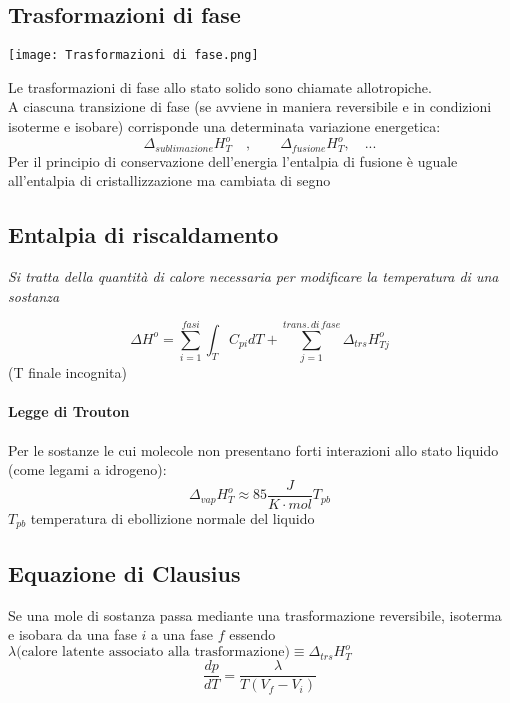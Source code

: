 \documentclass{article}
\newcommand{\ce}[1]{\begin{center}\textit{#1}\end{center}}
\begin{document}
\subsection{Trasformazioni di fase}
\begin{center}
    \texttt{[image: Trasformazioni di fase.png]}
\end{center}
Le trasformazioni di fase allo stato solido sono chiamate allotropiche. \\
A ciascuna transizione di fase (se avviene in maniera reversibile e in condizioni isoterme e isobare) corrisponde una determinata variazione energetica:
\begin{equation*}
    \Delta_{sublimazione}H^o_T \quad , \quad \quad \Delta_{fusione}H^o_T, \quad ...
\end{equation*}
Per il principio di conservazione dell'energia l'entalpia di fusione è uguale all'entalpia di cristallizzazione ma cambiata di segno

\subsection{Entalpia di riscaldamento}
\ce{Si tratta della quantità di calore necessaria per modificare la temperatura di una sostanza}
\begin{equation*}
    \Delta H^o=\sum_{i=1}^{fasi}\int_TC_{pi}dT+\sum_{j=1}^{trans. \, di \, fase} \Delta_{trs}H^o_{Tj}
\end{equation*}
(T finale incognita)
\paragraph{Legge di Trouton}
Per le sostanze le cui molecole non presentano forti interazioni allo stato liquido (come legami a idrogeno):
\begin{equation*}
    \Delta_{vap}H^o_T \approx 85 \frac{J}{K\cdot mol}T_{pb}
\end{equation*}
$T_{pb}$ temperatura di ebollizione normale del liquido


\subsection{Equazione di Clausius}
Se una mole di sostanza passa mediante una trasformazione reversibile, isoterma e isobara da una fase $i$ a una fase $f$ essendo $\lambda \text{(calore latente associato alla trasformazione)}\equiv \Delta_{trs}H^o_{T}$ 
\begin{equation*}
    \frac{dp}{dT}=\frac{\lambda}{T(V_f-V_i)}
\end{equation*}
\end{document}
